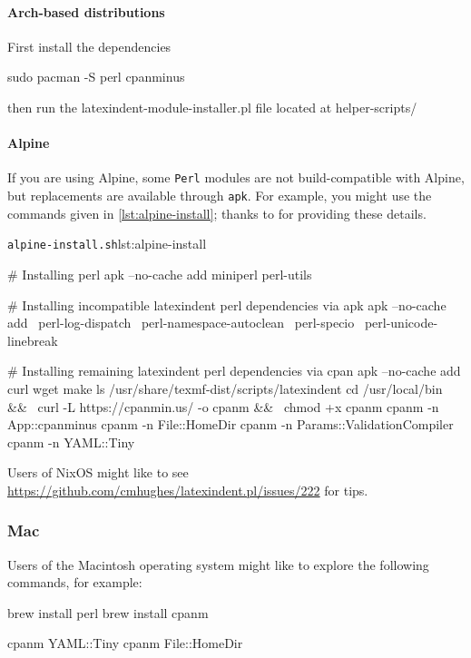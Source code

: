   \paragraph{Arch-based distributions}
   First install the dependencies
   \begin{commandshell}
sudo pacman -S perl cpanminus
\end{commandshell}
   then run the latexindent-module-installer.pl file located at helper-scripts/

  \paragraph{Alpine}
   If you are using Alpine, some \texttt{Perl} modules are not build-compatible with Alpine,
   but replacements are available through \texttt{apk}. For example, you might use the
   commands given in \cref{lst:alpine-install}; thanks to \cite{jun-sheaf} for providing
   these details.

   \begin{cmhlistings}[style=tcblatex,language=Bash]{\texttt{alpine-install.sh}}{lst:alpine-install}
		
# Installing perl
apk --no-cache add miniperl perl-utils

# Installing incompatible latexindent perl dependencies via apk
apk --no-cache add \
    perl-log-dispatch \
    perl-namespace-autoclean \
    perl-specio \
    perl-unicode-linebreak

# Installing remaining latexindent perl dependencies via cpan
apk --no-cache add curl wget make
ls /usr/share/texmf-dist/scripts/latexindent
cd /usr/local/bin && \
    curl -L https://cpanmin.us/ -o cpanm && \
    chmod +x cpanm
cpanm -n App::cpanminus
cpanm -n File::HomeDir
cpanm -n Params::ValidationCompiler
cpanm -n YAML::Tiny
\end{cmhlistings}

   Users of NixOS might like to see
   \href{https://github.com/cmhughes/latexindent.pl/issues/222}{https://github.com/cmhughes/latexindent.pl/issues/222}
   for tips.
 \subsubsection{Mac}
  Users of the Macintosh operating system might like to explore the following commands, for
  example:
  \begin{commandshell}
brew install perl
brew install cpanm

cpanm YAML::Tiny
cpanm File::HomeDir
\end{commandshell}

